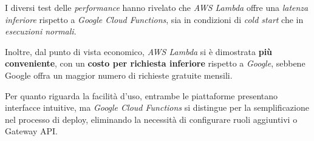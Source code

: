 I diversi test delle \textit{performance} hanno rivelato che \textit{AWS Lambda} offre una \textit{latenza inferiore} rispetto a \textit{Google Cloud Functions}, sia in condizioni di \textit{cold start} che in \textit{esecuzioni normali}. 

Inoltre, dal punto di vista economico, \textit{AWS Lambda} si è dimostrata \textbf{più conveniente}, con un \textbf{costo per richiesta inferiore} rispetto a \textit{Google}, sebbene Google offra un maggior numero di richieste gratuite mensili. 

Per quanto riguarda la facilità d'uso, entrambe le piattaforme presentano interfacce intuitive, ma \textit{Google Cloud Functions} si distingue per la semplificazione nel processo di deploy, eliminando la necessità di configurare ruoli aggiuntivi o Gateway API.